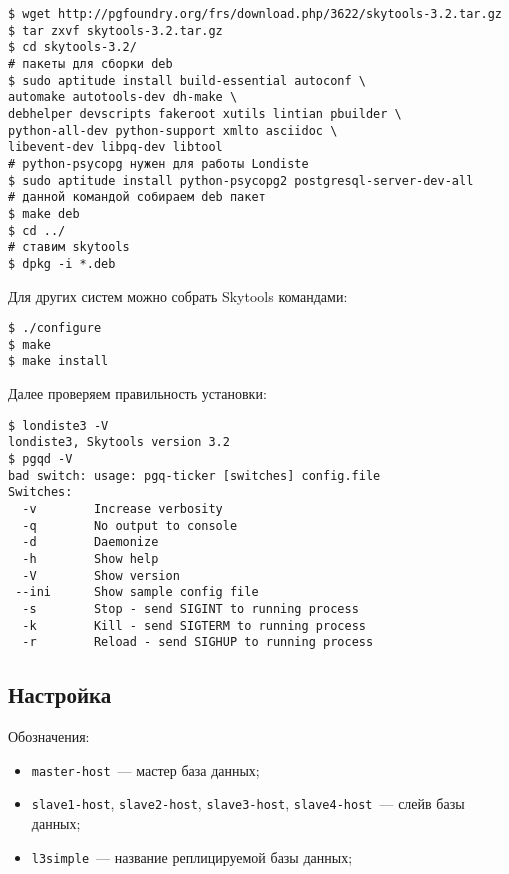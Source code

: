 \begin{lstlisting}[label=lst:londiste2,caption=Установка]
$ wget http://pgfoundry.org/frs/download.php/3622/skytools-3.2.tar.gz
$ tar zxvf skytools-3.2.tar.gz
$ cd skytools-3.2/
# пакеты для сборки deb
$ sudo aptitude install build-essential autoconf \
automake autotools-dev dh-make \
debhelper devscripts fakeroot xutils lintian pbuilder \
python-all-dev python-support xmlto asciidoc \
libevent-dev libpq-dev libtool
# python-psycopg нужен для работы Londiste
$ sudo aptitude install python-psycopg2 postgresql-server-dev-all
# данной командой собираем deb пакет
$ make deb
$ cd ../
# ставим skytools
$ dpkg -i *.deb
\end{lstlisting}

Для других систем можно собрать Skytools командами:

\begin{lstlisting}[label=lst:londiste3,caption=Установка]
$ ./configure
$ make
$ make install
\end{lstlisting}

Далее проверяем правильность установки:

\begin{lstlisting}[label=lst:londiste4,caption=Установка]
$ londiste3 -V
londiste3, Skytools version 3.2
$ pgqd -V
bad switch: usage: pgq-ticker [switches] config.file
Switches:
  -v        Increase verbosity
  -q        No output to console
  -d        Daemonize
  -h        Show help
  -V        Show version
 --ini      Show sample config file
  -s        Stop - send SIGINT to running process
  -k        Kill - send SIGTERM to running process
  -r        Reload - send SIGHUP to running process
\end{lstlisting}


\subsection{Настройка}

Обозначения:

\begin{itemize}
  \item \lstinline!master-host!~--- мастер база данных;
  \item \lstinline!slave1-host!, \lstinline!slave2-host!, \lstinline!slave3-host!, \lstinline!slave4-host!~--- слейв базы данных;
  \item \lstinline!l3simple!~--- название реплицируемой базы данных;
\end{itemize}

